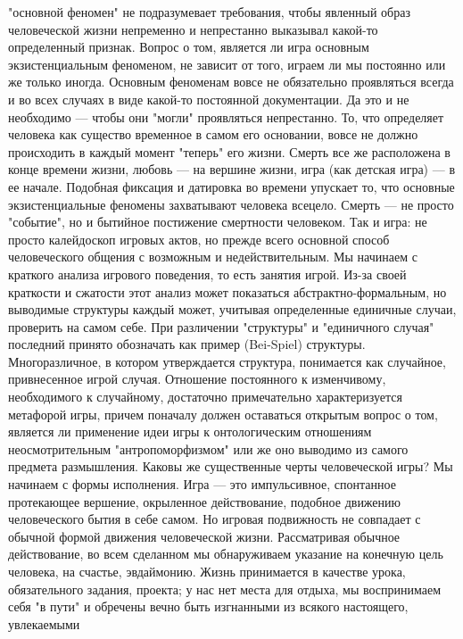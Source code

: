 \documentclass[12pt]{article}
\begin{document}
"основной феномен" не подразумевает требования, чтобы явленный образ человеческой жизни непременно и
непрестанно  выказывал  какой-то  определенный  признак.  Вопрос  о  том,  является  ли  игра  основным
экзистенциальным феноменом, не зависит от того, играем ли мы постоянно или же только иногда. Основным
феноменам  вовсе  не  обязательно  проявляться  всегда  и  во  всех  случаях  в  виде  какой-то  постоянной
документации. Да это и не необходимо --- чтобы они "могли" проявляться непрестанно. То, что определяет
человека как существо временное в самом его основании, вовсе не должно происходить в каждый момент
"теперь" его жизни. Смерть все же расположена в конце времени жизни, любовь --- на вершине жизни, игра (как
детская  игра)  ---  в  ее  начале.  Подобная  фиксация  и  датировка  во  времени  упускает  то,  что  основные
экзистенциальные феномены захватывают человека всецело. Смерть --- не просто "событие", но и бытийное
постижение  смертности  человеком.  Так  и  игра:  не  просто  калейдоскоп  игровых  актов,  но  прежде  всего
основной способ человеческого общения с возможным и недействительным. Мы начинаем с краткого анализа
игрового поведения, то есть занятия игрой. Из-за своей краткости и сжатости этот анализ может показаться
абстрактно-формальным, но выводимые структуры каждый может, учитывая определенные единичные случаи,
проверить на самом себе. При различении "структуры" и "единичного случая" последний принято обозначать
как  пример  (Bei-Spiel)  структуры.  Многоразличное,  в  котором  утверждается  структура,  понимается  как
случайное, привнесенное игрой случая. Отношение постоянного к изменчивому, необходимого к случайному,
достаточно примечательно характеризуется метафорой игры, причем поначалу должен оставаться открытым
вопрос  о  том,  является  ли  применение  идеи  игры  к  онтологическим  отношениям  неосмотрительным
"антропоморфизмом" или же оно выводимо из самого предмета размышления. Каковы же существенные черты
человеческой игры? Мы начинаем с формы исполнения. Игра --- это импульсивное, спонтанное протекающее  
вершение,  окрыленное  действование,  подобное  движению  человеческого  бытия  в  себе  самом.  Но  игровая
подвижность  не  совпадает  с  обычной  формой  движения  человеческой  жизни.  Рассматривая  обычное
действование,  во  всем  сделанном  мы  обнаруживаем  указание  на  конечную  цель  человека,  на  счастье,
эвдаймонию. Жизнь принимается в качестве урока, обязательного задания, проекта; у нас нет места для отдыха,
мы воспринимаем себя "в пути" и обречены вечно быть изгнанными из всякого настоящего, увлекаемыми
\end{document}
